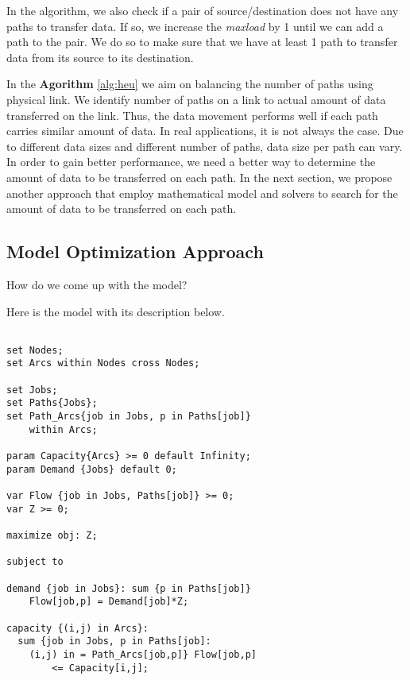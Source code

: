 In the algorithm, we also check if a pair of source/destination does not have any paths to transfer data. If so, we increase the \textit{maxload} by 1 until we can add a path to the pair. We do so to make sure that we have at least 1 path to transfer data from its source to its destination.

In the \textbf{Agorithm} \ref{alg:heu} we aim on balancing the number of paths using physical link. We identify number of paths on a link to actual amount of data transferred on the link.  Thus, the data movement performs well if each path carries similar amount of data. In real applications, it is not always the case. Due to different data sizes and different number of paths, data size per path can vary. In order to gain better performance, we need a better way to determine the amount of data to be transferred on each path. In the next section, we propose another approach that employ mathematical model and solvers to search for the amount of data to be transferred on each path. 

\subsection{Model Optimization Approach}

How do we come up with the model?

Here is the model with its description below.

\begingroup
\fontsize{9pt}{9pt}\selectfont

\begin{verbatim}

set Nodes;
set Arcs within Nodes cross Nodes;

set Jobs;
set Paths{Jobs};
set Path_Arcs{job in Jobs, p in Paths[job]} 
    within Arcs;

param Capacity{Arcs} >= 0 default Infinity;
param Demand {Jobs} default 0;

var Flow {job in Jobs, Paths[job]} >= 0;
var Z >= 0;

maximize obj: Z;

subject to

demand {job in Jobs}: sum {p in Paths[job]} 
	Flow[job,p] = Demand[job]*Z;

capacity {(i,j) in Arcs}:
  sum {job in Jobs, p in Paths[job]: 
    (i,j) in = Path_Arcs[job,p]} Flow[job,p] 
		<= Capacity[i,j];

\end{verbatim}

\endgroup

